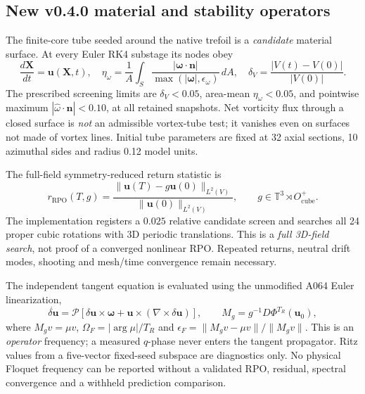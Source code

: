 \documentclass[11pt,a4paper]{article}
\begin{document}
\subsection*{New v0.4.0 material and stability operators}
The finite-core tube seeded around the native trefoil is a \emph{candidate} material
surface.  At every Euler RK4 substage its nodes obey
\begin{equation}
\frac{d\mathbf X}{dt}=\mathbf u(\mathbf X,t),\quad
\eta_{\omega}=\frac1A\int_S\frac{|\bm\omega\cdot\mathbf n|}{\max(|\bm\omega|,\epsilon_{\omega})}\,dA,\quad
\delta_V=\frac{|V(t)-V(0)|}{|V(0)|}.
\end{equation}
The prescribed screening limits are $\delta_V<0.05$, area-mean
$\eta_{\omega}<0.05$, and pointwise maximum $|\widehat\omega\cdot\mathbf n|<0.10$,
at all retained snapshots.  Net vorticity flux through a closed surface is
\emph{not} an admissible vortex-tube test; it vanishes even on surfaces not
made of vortex lines.  Initial tube parameters are fixed at 32 axial
sections, 10 azimuthal sides and radius 0.12 model units.

The full-field symmetry-reduced return statistic is
\begin{equation}
 r_{\mathrm{RPO}}(T,g)=\frac{\|\mathbf u(T)-g\mathbf u(0)\|_{L^2(V)}}
 {\|\mathbf u(0)\|_{L^2(V)}},\qquad
 g\in\mathbb T^3\rtimes O^{+}_{\mathrm{cube}}.
\end{equation}
The implementation registers a $0.025$ relative candidate screen and searches
all 24 proper cubic rotations with 3D periodic translations.  This is a
\emph{full 3D-field search}, not proof of a converged nonlinear RPO.
Repeated returns, neutral drift modes, shooting and mesh/time convergence
remain necessary.

The independent tangent equation is evaluated using the unmodified A064
Euler linearization,
\begin{equation}
\dot{\delta\mathbf u}=\mathcal P[\delta\mathbf u\times\bm\omega+
\mathbf u\times(\nabla\times\delta\mathbf u)],\qquad
M_g=g^{-1}D\Phi^{T_R}(\mathbf u_0),
\end{equation}
where $M_gv=\mu v$, $\Omega_F=|\arg\mu|/T_R$ and
$\epsilon_F=\|M_gv-\mu v\|/\|M_gv\|$.  This is an \emph{operator}
frequency; a measured $q$-phase never enters the tangent propagator.
Ritz values from a five-vector fixed-seed subspace are diagnostics only.
No physical Floquet frequency can be reported without a validated RPO,
residual, spectral convergence and a withheld prediction comparison.

\end{document}
